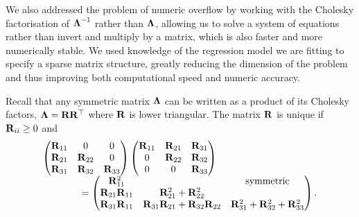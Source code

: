 We also addressed the problem of numeric overflow by working with the Cholesky
factorisation of ${\boldsymbol \Lambda}^{-1}$ rather than ${\boldsymbol \Lambda}$, allowing us to solve a
system of equations rather than invert and multiply by a matrix, which is also
faster and more numerically stable. We used knowledge of the regression  model
we are fitting to specify a sparse matrix structure, greatly reducing the
dimension of   the problem and thus improving both computational speed and
numeric accuracy.

	
Recall that any symmetric matrix ${\boldsymbol \Lambda}$ can be written as a product of its
Cholesky factors, ${\boldsymbol \Lambda} = {\bf R} {\bf R}^\top$ where ${\bf R}$ is lower triangular.
The matrix ${\bf R}$ is unique if ${\bf R}_{ii} \geq 0$ and
\begin{equation*}
\label{eq:cholesky_factorisation}
\begin{array}{l}
	\begin{pmatrix}
	{\bf R}_{11}          & 0                                    & 0                                     \\
	{\bf R}_{21}          & {\bf R}_{22}                             & 0                                     \\
	{\bf R}_{31}          & {\bf R}_{32}                             & {\bf R}_{33}                              
	\end{pmatrix}
	\begin{pmatrix}
	{\bf R}_{11}          & {\bf R}_{21}                             & {\bf R}_{31}                              \\
	0                 & {\bf R}_{22}                             & {\bf R}_{32}                              \\
	0                 & 0                                    & {\bf R}_{33}                              
	\end{pmatrix}
	\\
	\qquad \qquad  =\begin{pmatrix}
	{\bf R}_{11}^2        &                                      & \text{symmetric}                      \\
	{\bf R}_{21}{\bf R}_{11} & {\bf R}_{21}^2 + {\bf R}_{22}^2 \\
	{\bf R}_{31} {\bf R}_{11} & {\bf R}_{31}{\bf R}_{21} + {\bf R}_{32} {\bf R}_{22} & {\bf R}_{31}^2 + {\bf R}_{32} ^2 + {\bf R}_{33}^2 
	\end{pmatrix}.
\end{array}
\end{equation*}

